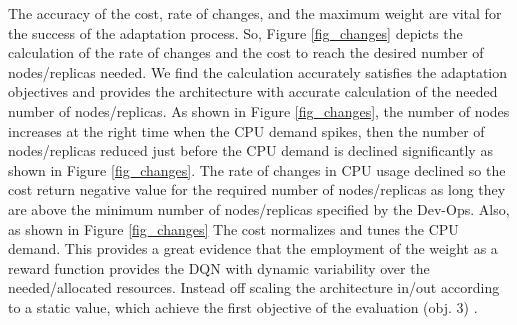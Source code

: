 \documentclass{ieeeaccess}
\begin{document}
The accuracy of the cost, rate of changes, and the maximum weight are vital for the success of the adaptation process. So, Figure \ref{fig_changes} depicts the calculation of the rate of changes and the cost to reach the desired number of nodes/replicas needed. We find the calculation accurately satisfies the adaptation objectives and provides the architecture with accurate calculation of the needed number of nodes/replicas. As shown in Figure \ref{fig_changes}, the number of nodes increases at the right time when the CPU demand spikes, then the number of nodes/replicas reduced just before the CPU demand is declined significantly as shown in Figure \ref{fig_changes}. The rate of changes in CPU usage declined so the cost return negative value for the required number of nodes/replicas as long they are above the minimum number of nodes/replicas specified by the Dev-Ops. Also, as shown in Figure \ref{fig_changes} The cost normalizes and tunes the CPU demand. This provides a great evidence that the employment of the weight as a reward function provides the DQN with dynamic variability over the needed/allocated resources. Instead off scaling the architecture in/out according to a static value, which achieve the first objective of the evaluation (obj. 3) . 




\end{document}
